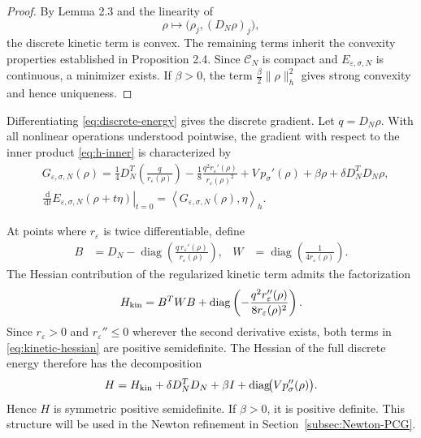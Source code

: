 \documentclass[11pt]{article}
\newcommand{\CN}{\mathcal{C}_N}
\newcommand{\dd}{\,\mathrm{d}}
\newcommand{\eps}{\varepsilon}
\newcommand{\sig}{\sigma}
\newcommand{\inner}[2]{\left\langle #1,#2\right\rangle}
\theoremstyle{plain}
\theoremstyle{definition}
\numberwithin{equation}{section}
\begin{document}
\begin{proof}
By Lemma 2.3 and the linearity of
\[
\rho\mapsto \bigl(\rho_j,(D_N\rho)_j\bigr),
\]
the discrete kinetic term is convex. The remaining terms inherit
the convexity properties established in Proposition 2.4.
Since $\CN$ is compact and $E_{\eps,\sig,N}$ is continuous, a
minimizer exists. If $\beta>0$, the term
$\frac{\beta}{2}\|\rho\|_h^2$ gives strong convexity and hence
uniqueness.
\end{proof}

Differentiating \eqref{eq:discrete-energy} gives the discrete gradient.
Let $q=D_N\rho$. With all nonlinear operations understood
pointwise, the gradient with respect to the inner product
\eqref{eq:h-inner} is characterized by
\begin{equation}
\label{eq:discrete-gradient}
\begin{aligned}
&G_{\eps,\sig,N}(\rho)
=
\frac14D_N^T
\left(
\frac{q}{r_\eps(\rho)}
\right)
-\frac18
\frac{q^2r_\eps'(\rho)}
     {r_\eps(\rho)^2}
+V\,p_\sig'(\rho)
+\beta\rho
+\delta D_N^TD_N\rho,\\
&\left.
\frac{\dd}{\dd t}
E_{\eps,\sig,N}(\rho+t\eta)
\right|_{t=0}
=
\inner{G_{\eps,\sig,N}(\rho)}{\eta}_h .
\end{aligned}
\end{equation}

At points where $r_\eps$ is twice differentiable, define
\begin{equation}
\label{eq:kinetic-hessian-factorization}
\begin{aligned}
B
&=
D_N-
\operatorname{diag}
\left(
\frac{q\,r_\eps'(\rho)}
     {r_\eps(\rho)}
\right),
&
W
&=
\operatorname{diag}
\left(
\frac{1}{4r_\eps(\rho)}
\right).
\end{aligned}
\end{equation}
The Hessian contribution of the regularized kinetic term admits the
factorization
\begin{equation}
\label{eq:kinetic-hessian}
H_{\rm kin}
=
B^TWB
+
\operatorname{diag}
\left(
-\frac{q^2r_\eps''(\rho)}
       {8r_\eps(\rho)^2}
\right).
\end{equation}
Since $r_\eps>0$ and $r_\eps''\le0$ wherever the second derivative
exists, both terms in \eqref{eq:kinetic-hessian} are positive
semidefinite. The Hessian of the full discrete energy therefore has
the decomposition
\begin{equation}
\label{eq:full-hessian-spd-form}
H
=
H_{\rm kin}
+\delta D_N^TD_N
+\beta I
+\operatorname{diag}\!\bigl(Vp_\sig''(\rho)\bigr).
\end{equation}
Hence $H$ is symmetric positive semidefinite. If $\beta>0$, it is
positive definite. This structure will be used in the Newton refinement in
Section~\ref{subsec:Newton-PCG}.
\end{document}
